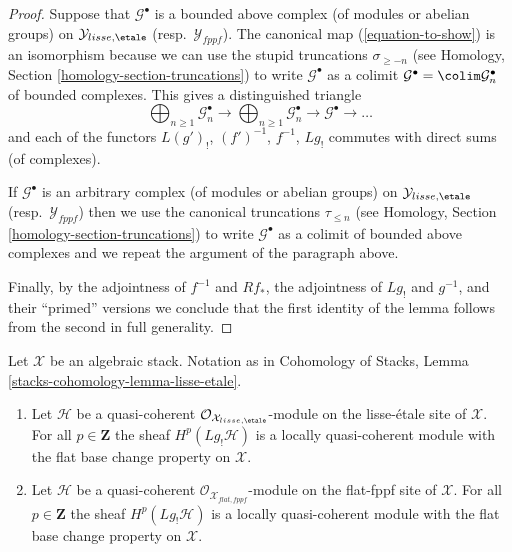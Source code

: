 \begin{proof}
\medskip\noindent
Suppose that $\mathcal{G}^\bullet$ is a bounded above complex
(of modules or abelian groups) on
$\mathcal{Y}_{lisse,\etale}$ (resp.\ $\mathcal{Y}_{fppf}$).
The canonical map (\ref{equation-to-show})
is an isomorphism because we can use the stupid truncations
$\sigma_{\geq -n}$ (see
Homology, Section \ref{homology-section-truncations}) to write
$\mathcal{G}^\bullet$ as a colimit
$\mathcal{G}^\bullet = \colim \mathcal{G}_n^\bullet$
of bounded complexes. This gives a distinguished triangle
$$
\bigoplus\nolimits_{n \geq 1} \mathcal{G}_n^\bullet \to
\bigoplus\nolimits_{n \geq 1} \mathcal{G}_n^\bullet \to
\mathcal{G}^\bullet \to \ldots
$$
and each of the functors $L(g')_!$, $(f')^{-1}$, $f^{-1}$, $Lg_!$
commutes with direct sums (of complexes).

\medskip\noindent
If $\mathcal{G}^\bullet$ is an arbitrary complex
(of modules or abelian groups) on
$\mathcal{Y}_{lisse,\etale}$ (resp.\ $\mathcal{Y}_{fppf}$)
then we use the canonical truncations $\tau_{\leq n}$ (see
Homology, Section \ref{homology-section-truncations})
to write $\mathcal{G}^\bullet$ as a colimit of bounded above complexes
and we repeat the argument of the paragraph above.

\medskip\noindent
Finally, by the adjointness of
$f^{-1}$ and $Rf_*$, the adjointness of $Lg_!$ and $g^{-1}$, and
their ``primed'' versions we conclude that the first
identity of the lemma follows from the second in full generality.
\end{proof}

\begin{lemma}
\label{lemma-higher-shriek-quasi-coherent}
Let $\mathcal{X}$ be an algebraic stack. Notation as in
Cohomology of Stacks,
Lemma \ref{stacks-cohomology-lemma-lisse-etale}.
\begin{enumerate}
\item Let $\mathcal{H}$ be a quasi-coherent
$\mathcal{O}_{\mathcal{X}_{lisse,\etale}}$-module 
on the lisse-\'etale site of $\mathcal{X}$. For all $p \in \mathbf{Z}$
the sheaf $H^p(Lg_!\mathcal{H})$ is a locally quasi-coherent module with
the flat base change property on $\mathcal{X}$.
\item Let $\mathcal{H}$ be a quasi-coherent
$\mathcal{O}_{\mathcal{X}_{flat,fppf}}$-module 
on the flat-fppf site of $\mathcal{X}$. For all $p \in \mathbf{Z}$
the sheaf $H^p(Lg_!\mathcal{H})$ is a locally quasi-coherent module with the
flat base change property on $\mathcal{X}$.
\end{enumerate}
\end{lemma}

